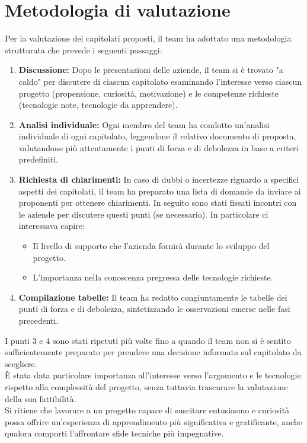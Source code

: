 \documentclass[a4paper,11pt]{article}
\begin{document}
\newpage
\tableofcontents

\newpage
\section{Metodologia di valutazione}
Per la valutazione dei capitolati proposti, il team ha adottato una metodologia strutturata che prevede i seguenti passaggi:
\begin{enumerate}
\item \textbf{Discussione:} Dopo le presentazioni delle aziende, il team si è trovato "a caldo" per discutere di ciascun capitolato esaminando l'interesse verso ciascun progetto (propensione, curiosità, motivazione) e le competenze richieste (tecnologie note, tecnologie da apprendere).
\item \textbf{Analisi individuale:} Ogni membro del team ha condotto un'analisi individuale di ogni capitolato, leggendone il relativo documento di proposta, valutandone più attentamente i punti di forza e di debolezza in base a criteri predefiniti.
\item \textbf{Richiesta di chiarimenti:} In caso di dubbi o incertezze riguardo a specifici aspetti dei capitolati, il team ha preparato una lista di domande da inviare ai proponenti per ottenere chiarimenti. In seguito sono stati fissati incontri con le aziende per discutere questi punti (se necessario).
 In particolare ci interessava capire:
 \begin{itemize}
  \item Il livello di supporto che l'azienda fornirà durante lo sviluppo del progetto.
  \item L'importanza nella conoscenza pregressa delle tecnologie richieste.
 \end{itemize}
\item \textbf{Compilazione tabelle:} Il team ha redatto congiuntamente le tabelle dei punti di forza e di debolezza, sintetizzando le osservazioni emerse nelle fasi precedenti.
\end{enumerate}
I punti 3 e 4 sono stati ripetuti più volte fino a quando il team non si è sentito sufficientemente preparato per prendere una decisione informata sul capitolato da scegliere.\\
È stata data particolare importanza all'interesse verso l'argomento e le tecnologie rispetto alla complessità del progetto, senza tuttavia trascurare la valutazione della sua fattibilità.\\
Si ritiene che lavorare a un progetto capace di suscitare entusiasmo e curiosità possa offrire un'esperienza di apprendimento più significativa e gratificante, anche qualora comporti l'affrontare sfide tecniche più impegnative.
\end{document}
